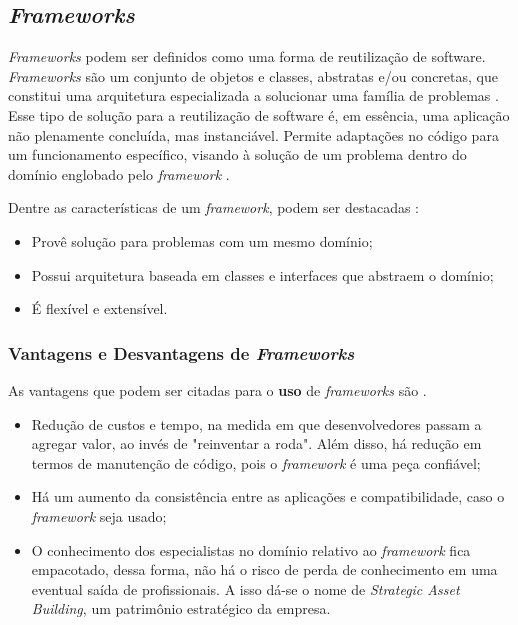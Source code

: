 \subsection{\textit{Frameworks}}
\textit{Frameworks} podem ser definidos como uma forma de reutilização de software.
\textit{Frameworks} são um conjunto de objetos e classes, abstratas e/ou concretas,
que constitui uma arquitetura especializada a solucionar uma família de problemas
\cite{barretoJunior2006}. Esse tipo de solução para a reutilização de software é,
em essência, uma aplicação não plenamente concluída, mas instanciável. Permite
adaptações no código para um funcionamento específico, visando à solução de um
problema dentro do domínio englobado pelo \textit{framework} \cite{barretoJunior2006}.
\par
\indent Dentre as características de um \textit{framework}, podem ser destacadas
\cite{sauve2006}:
\begin{itemize}
\item Provê solução para problemas com um mesmo domínio;
\item Possui arquitetura baseada em classes e interfaces que abstraem o domínio;
\item É flexível e extensível.
\end{itemize}
\par
\subsubsection{Vantagens e Desvantagens de \textit{Frameworks}}
As vantagens que podem ser citadas para o \textbf{uso} de \textit{frameworks} são
\cite{barretoJunior2006} \cite{sauve2006}.
\begin{itemize}
\item Redução de custos e tempo, na medida em que desenvolvedores passam a
agregar valor, ao invés de "reinventar a roda". Além disso, há redução em termos
de manutenção de código, pois o \textit{framework} é uma peça confiável;
\item Há um aumento da consistência entre as aplicações e compatibilidade, caso o
\textit{framework} seja usado;
\item O conhecimento dos especialistas no domínio relativo ao \textit{framework}
fica empacotado, dessa forma, não há o risco de perda de conhecimento em uma eventual
saída de profissionais. A isso dá-se o nome de \textit{Strategic Asset Building},
um patrimônio estratégico da empresa.
\end{itemize}

